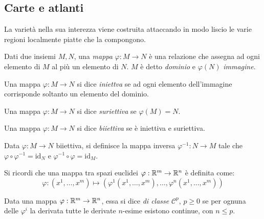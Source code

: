\subsection{Carte e atlanti}

La varietà nella sua interezza viene costruita attaccando in modo liscio le varie regioni localmente piatte che la compongono.

\begin{definition}
	Dati due insiemi $ M,N $, una \textit{mappa} $ \varphi : M \rightarrow N $ è una relazione che assegna ad ogni elemento di $ M $ al più un elemento di $ N $. $ M $ è detto \textit{dominio} e $ \varphi(N) $ \textit{immagine}.
\end{definition}

\begin{definition}
	Una mappa $ \varphi : M \rightarrow N $ si dice \textit{iniettva} se ad ogni elemento dell'immagine corrisponde soltanto un elemento del dominio.
\end{definition}

\begin{definition}
	Una mappa $ \varphi : M \rightarrow N $ si dice \textit{suriettiva} se $ \varphi(M) = N $.
\end{definition}

\begin{definition}
	Una mappa $ \varphi : M \rightarrow N $ si dice \textit{biiettiva} se è iniettiva e suriettiva.
\end{definition}

\begin{definition}
	Data $ \varphi : M \rightarrow N $ biiettiva, si definisce la mappa inversa $ \varphi^{-1} : N \rightarrow M $ tale che $ \varphi \circ \varphi^{-1} = \text{id}_N $ e $ \varphi^{-1} \circ \varphi = \text{id}_M $.
\end{definition}

Si ricordi che una mappa tra spazi euclidei $ \varphi : \mathbb{R}^m \rightarrow \mathbb{R}^n $ è definita come:
\begin{equation}
	\varphi : (x^1,\dots,x^m) \mapsto (\varphi^1(x^1,\dots,x^m),\dots,\varphi^n(x^1,\dots,x^m))
	\label{eq:6.1}
\end{equation}

\begin{definition}
	Data una mappa $ \varphi : \mathbb{R}^m \rightarrow \mathbb{R}^n $, essa si dice \textit{di classe} $ \mathcal{C}^p $, $ p \ge 0 $ se per ognuna delle $ \varphi^i $ la derivata tutte le derivate $ n $-esime esistono continue, con $ n \le p $.
\end{definition}

